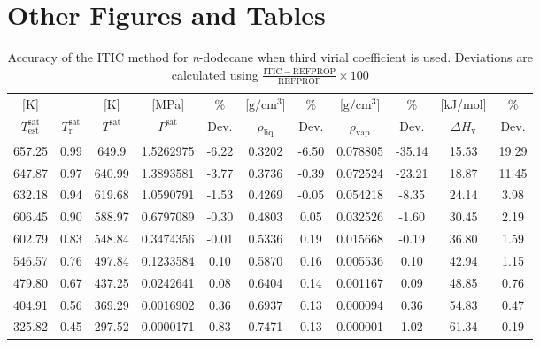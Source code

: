 \documentclass[%
 aip,
 jcp,
 sd,%
 amsmath,amssymb,
]{revtex4-1}
\begin{document}
\clearpage
\section{Other Figures and Tables}
\clearpage

\begin{table*}[]
\centering
\caption{Accuracy of the ITIC method for \textit{n}-dodecane when third virial coefficient is used. Deviations are calculated using $\frac{\mathrm{ITIC - REFPROP}}{\mathrm{REFPROP}} \times 100$}
\label{tab:NIST-VAL-C12-FTT}
\begin{tabular}{ccccccccccc}
\hline
{[}K{]}&  & {[}K{]} &	 {[}MPa{]} &	 \% 	& {[}$\mathrm{g/cm^3}${]} & \% & {[}$\mathrm{g/cm^3}${]} & \% 	& {[}kJ/mol{]} & \% \\
$T_\mathrm{est}^{\mathrm{sat}}$ & $T_\mathrm{r}^{\mathrm{sat}}$ & $T^{\mathrm{sat}}$ & $P^{\mathrm{sat}}$ & Dev. & $\rho_{\mathrm{liq}}$ &	 Dev. & $\rho_{\mathrm{vap}}$ & Dev. & $\Delta H_{\mathrm{v}}$ & Dev. \\
\hline
657.25 & 0.99 & 649.9  & 1.5262975 & -6.22 & 0.3202 & -6.50 & 0.078805 & -35.14 & 15.53 & 19.29 \\
647.87 & 0.97 & 640.99 & 1.3893581 & -3.77 & 0.3736 & -0.39 & 0.072524 & -23.21 & 18.87 & 11.45 \\
632.18 & 0.94 & 619.68 & 1.0590791 & -1.53 & 0.4269 & -0.05 & 0.054218 & -8.35  & 24.14 & 3.98  \\
606.45 & 0.90 & 588.97 & 0.6797089 & -0.30 & 0.4803 & 0.05  & 0.032526 & -1.60  & 30.45 & 2.19  \\
602.79 & 0.83 & 548.84 & 0.3474356 & -0.01 & 0.5336 & 0.19  & 0.015668 & -0.19  & 36.80 & 1.59  \\
546.57 & 0.76 & 497.84 & 0.1233584 & 0.10  & 0.5870 & 0.16  & 0.005536 & 0.10   & 42.94 & 1.15  \\
479.80 & 0.67 & 437.25 & 0.0242641 & 0.08  & 0.6404 & 0.14  & 0.001167 & 0.09   & 48.85 & 0.76  \\
404.91 & 0.56 & 369.29 & 0.0016902 & 0.36  & 0.6937 & 0.13  & 0.000094 & 0.36   & 54.83 & 0.47  \\
325.82 & 0.45 & 297.52 & 0.0000171 & 0.83  & 0.7471 & 0.13  & 0.000001 & 1.02   & 61.34 & 0.19  \\	
\hline		
\end{tabular}

\end{table*}
\end{document}
